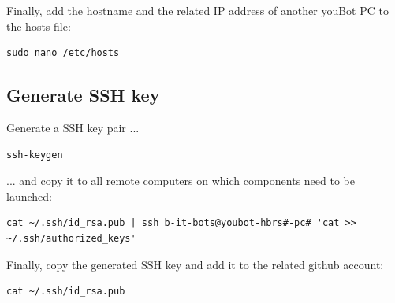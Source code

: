 \documentclass[a4paper,12pt]{article}
\begin{document}
Finally, add the hostname and the related IP address of another youBot PC to the hosts file:
\begin{lstlisting}
sudo nano /etc/hosts
\end{lstlisting}

\subsection{Generate SSH key}
Generate a SSH key pair ...
\begin{lstlisting}
ssh-keygen
\end{lstlisting}

... and copy it to all remote computers on which components need to be launched:
\begin{lstlisting}
cat ~/.ssh/id_rsa.pub | ssh b-it-bots@youbot-hbrs#-pc# 'cat >> ~/.ssh/authorized_keys'
\end{lstlisting}

Finally, copy the generated SSH key and add it to the related github account:
\begin{lstlisting}
cat ~/.ssh/id_rsa.pub
\end{lstlisting}
\end{document}
